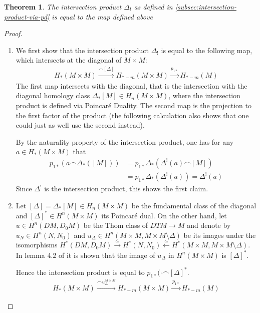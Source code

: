 \documentclass{scrartcl}
\theoremstyle{plain}
\newtheorem{theorem}{Theorem}[section]
\theoremstyle{definition}
\newcommand{\capp}{\mathbin{\frown}}
\newcommand{\quiso}{\simeq}
\let\xto\xrightarrow
\let\xfrom\xleftarrow
\begin{document}
\begin{theorem}\label{thm:intersection_product_tubular}
    The intersection product $\Delta_!$ as defined in \cref{subsec:intersection-product-via-pd} is equal to the map defined above
\end{theorem}
\begin{proof}
    \begin{enumerate}
        \item We first show that the intersection product $\Delta_!$ is equal to the following map, which intersects at the diagonal of $M\times M$: 
        \begin{align*}
            H_*(M\times M) \xrightarrow{\capp [\Delta]} H_{*-m}(M\times M) \xrightarrow{p_{1*}} H_{*-m}(M)
        \end{align*}
        The first map intersects with the diagonal, that is the intersection with the diagonal homology class $\Delta_*[M]\in H_n(M\times M)$, where the intersection product is defined via Poincaré Duality. The second map is the projection to the first factor of the product (the following calculation also shows that one could just as well use the second instead).

        By the naturality property of the intersection product, one has for any $a\in H_*(M\times M)$ that
        \begin{align*}
            p_{1*}(a \capp \Delta_*([M])) &= p_{1*}\Delta_*(\Delta^!(a) \capp [M]) \\
            &= p_{1*}\Delta_*(\Delta^!(a)) = \Delta^!(a)
        \end{align*}
        Since $\Delta^!$ is the intersection product, this shows the first claim.

        \item Let $[\Delta] = \Delta_*[M]\in H_n(M\times M)$ be the fundamental class of the diagonal and $[\Delta]^*\in H^n(M\times M)$ its Poincaré dual. On the other hand, let $u\in H^n(DM, D_0M)$ be the Thom class of $DTM\to M$ and denote by $u_N\in H^n(N, N_0)$ and $u_{\Delta}\in H^n(M\times M, M\times M\setminus\Delta)$ be its images under the isomorphisms $H^*(DM, D_0M) \xto{\quiso} H^*(N, N_0) \xfrom{\quiso} H^*(M\times M, M\times M\setminus\Delta)$. In lemma 4.2 of \cite{hutchings2011cup} it is shown that the image of $u_\Delta$ in $H^n(M\times M)$ is $[\Delta]^*$.

        Hence the intersection product is equal to $p_{1*}(\cdot \capp [\Delta]^*$. 
        \begin{align*}
            H_*(M\times M) \xrightarrow{\capp u^{M\times M}_\Delta} H_{*-m}(M\times M) \xrightarrow{p_{1*}} H_{*-m}(M)
        \end{align*}
            


\end{enumerate}
\end{proof}
\end{document}
